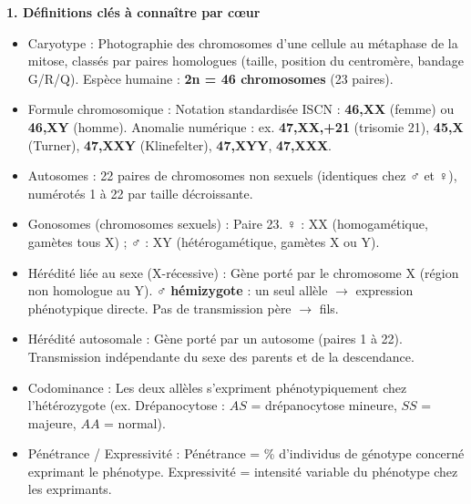\documentclass[11pt]{article}
\newcommand{\cle}[1]{{\popxbold\color{popdark}#1}}
\begin{document}
\begin{bilan}

\textbf{1. Définitions clés à connaître par cœur}
\begin{itemize}
  \item \cle{Caryotype} : Photographie des chromosomes d'une cellule au métaphase de la mitose, classés par paires homologues (taille, position du centromère, bandage G/R/Q). Espèce humaine : \textbf{2n = 46 chromosomes} (23 paires).
  \item \cle{Formule chromosomique} : Notation standardisée ISCN : \textbf{46,XX} (femme) ou \textbf{46,XY} (homme). Anomalie numérique : ex. \textbf{47,XX,+21} (trisomie 21), \textbf{45,X} (Turner), \textbf{47,XXY} (Klinefelter), \textbf{47,XYY}, \textbf{47,XXX}.
  \item \cle{Autosomes} : 22 paires de chromosomes non sexuels (identiques chez ♂ et ♀), numérotés 1 à 22 par taille décroissante.
  \item \cle{Gonosomes (chromosomes sexuels)} : Paire 23. ♀ : XX (homogamétique, gamètes tous X) ; ♂ : XY (hétérogamétique, gamètes X ou Y).
  \item \cle{Hérédité liée au sexe (X-récessive)} : Gène porté par le chromosome X (région non homologue au Y). ♂ \textbf{hémizygote} : un seul allèle $\rightarrow$ expression phénotypique directe. Pas de transmission père $\to$ fils.
  \item \cle{Hérédité autosomale} : Gène porté par un autosome (paires 1 à 22). Transmission indépendante du sexe des parents et de la descendance.
  \item \cle{Codominance} : Les deux allèles s'expriment phénotypiquement chez l'hétérozygote (ex. Drépanocytose : $AS$ = drépanocytose mineure, $SS$ = majeure, $AA$ = normal).
  \item \cle{Pénétrance / Expressivité} : Pénétrance = \% d'individus de génotype concerné exprimant le phénotype. Expressivité = intensité variable du phénotype chez les exprimants.
\end{itemize}


\end{bilan}
\end{document}

